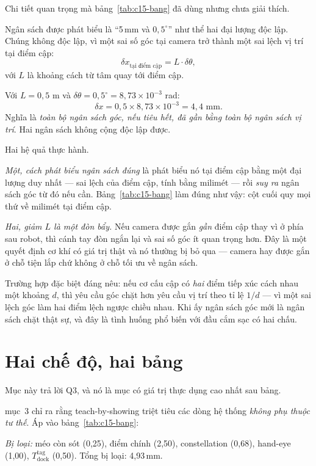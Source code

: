 \documentclass[../../marker.tex]{subfiles}
\begin{document}
Chi tiết quan trọng mà bảng~\ref{tab:c15-bang} đã dùng nhưng chưa giải thích.

Ngân sách được phát biểu là ``5\,mm và \(0{,}5^\circ\)'' như thể hai đại lượng độc lập. Chúng không độc lập, vì một sai số góc tại camera trở thành một sai lệch vị trí tại điểm cập:
\[
\delta x_{\text{tại điểm cập}} = L \cdot \delta\theta,
\]
với \(L\) là khoảng cách từ tâm quay tới điểm cập.

Với \(L = 0{,}5\) m và \(\delta\theta = 0{,}5^\circ = 8{,}73\times10^{-3}\) rad:
\[
\delta x = 0{,}5 \times 8{,}73\times10^{-3} = 4{,}4\text{ mm}.
\]
Nghĩa là \emph{toàn bộ ngân sách góc, nếu tiêu hết, đã gần bằng toàn bộ ngân sách vị trí}. Hai ngân sách không cộng độc lập được.

Hai hệ quả thực hành.

\emph{Một, cách phát biểu ngân sách đúng} là phát biểu nó tại điểm cập bằng một đại lượng duy nhất --- sai lệch của điểm cập, tính bằng milimét --- rồi \emph{suy ra} ngân sách góc từ đó nếu cần. Bảng~\ref{tab:c15-bang} làm đúng như vậy: cột cuối quy mọi thứ về milimét tại điểm cập.

\emph{Hai, giảm \(L\) là một đòn bẩy.} Nếu camera được gắn \emph{gần} điểm cập thay vì ở phía sau robot, thì cánh tay đòn ngắn lại và sai số góc ít quan trọng hơn. Đây là một quyết định cơ khí có giá trị thật và nó thường bị bỏ qua --- camera hay được gắn ở chỗ tiện lắp chứ không ở chỗ tối ưu về ngân sách.

Trường hợp đặc biệt đáng nêu: nếu cơ cấu cập có \emph{hai} điểm tiếp xúc cách nhau một khoảng \(d\), thì yêu cầu góc chặt hơn yêu cầu vị trí theo tỉ lệ \(1/d\) --- vì một sai lệch góc làm hai điểm lệch ngược chiều nhau. Khi ấy ngân sách góc mới là ngân sách chặt thật sự, và đây là tình huống phổ biến với đầu cắm sạc có hai chấu.

\section{Hai chế độ, hai bảng}

Mục này trả lời Q3, và nó là mục có giá trị thực dụng cao nhất sau bảng.

 mục~3 chỉ ra rằng teach-by-showing triệt tiêu các dòng hệ thống \emph{không phụ thuộc tư thế}. Áp vào bảng~\ref{tab:c15-bang}:

\emph{Bị loại:} méo còn sót (0,25), điểm chính (2,50), constellation (0,68), hand-eye (1,00), \(T^{\text{tag}}_{\text{dock}}\) (0,50). Tổng bị loại: 4,93\,mm.
\end{document}
